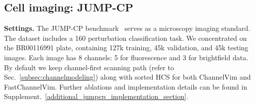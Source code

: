\subsection{Cell imaging: JUMP-CP}
\label{subexp:cell}

\noindent \textbf{Settings.} The JUMP-CP benchmark~\cite{chandrasekaran2023jump} serves as a microscopy imaging standard. The dataset includes a 160 perturbation classification task. We concentrated on the BR00116991 plate, containing 127k training, 45k validation, and 45k testing images. Each image has 8 channels: 5 for fluorescence and 3 for brightfield data. By default we keep channel-first scanning path (refer to Sec.~\ref{subsec:channelmodeling}) along with sorted HCS for both ChannelVim and FastChannelVim. Further ablations and implementation details can be found in Supplement.~\ref{additional_jumpcp_implementation_section}. 


\begin{table}[ht]
    \caption{Benchmarks of 160-way perturbed gene prediction on JUMP-CP dataset. All methods use hierarchical channel sampling~\cite{channelvit} for training, and testing is done using all 8 channels. Each cell image is of resolution $224 \times 224 \times 8$}
    \vspace{-6pt}
    \begin{center}
\end{center}
\vspace{-6pt}
    \label{tab:jumpcp_results}
\end{table}


